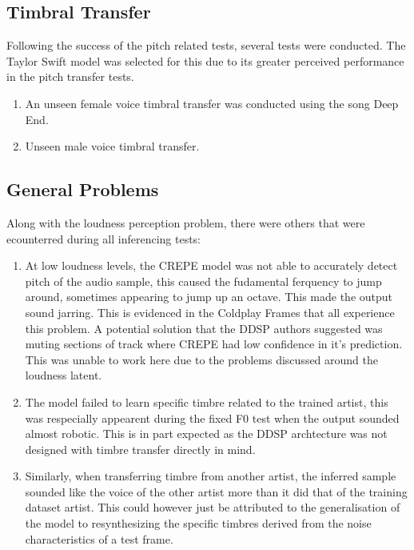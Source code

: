 \subsection{Timbral Transfer}

Following the success of the pitch related tests, several tests were conducted. The Taylor Swift model was selected for this due to its greater perceived performance in the pitch transfer tests.

\begin{enumerate}
    \item An unseen female voice timbral transfer was conducted using the song Deep End\cite{Birdy}. 
    \item Unseen male voice timbral transfer. 
\end{enumerate}

\subsection{General Problems}

Along with the loudness perception problem, there were others that were ecounterred during all inferencing tests:

\begin{enumerate}
    \item At low loudness levels, the CREPE model was not able to accurately detect pitch of the audio sample, this caused the fudamental ferquency to jump around, sometimes appearing to jump up an octave. This made the output sound jarring. This is evidenced in the Coldplay Frames that all experience this problem. A potential solution that the DDSP authors suggested was muting sections of track where CREPE had low confidence in it's prediction. This was unable to work here due to the problems discussed around the loudness latent.
    \item The model failed to learn specific timbre related to the trained artist, this was respecially appearent during the fixed F0 test when the output sounded almost robotic. This is in part expected as the DDSP archtecture was not designed with timbre transfer directly in mind.
    \item Similarly, when transferring timbre from another artist, the inferred sample sounded like the voice of the other artist more than it did that of the training dataset artist. This could however just be attributed to the generalisation of the model to resynthesizing the specific timbres derived from the noise characteristics of a test frame.
\end{enumerate}